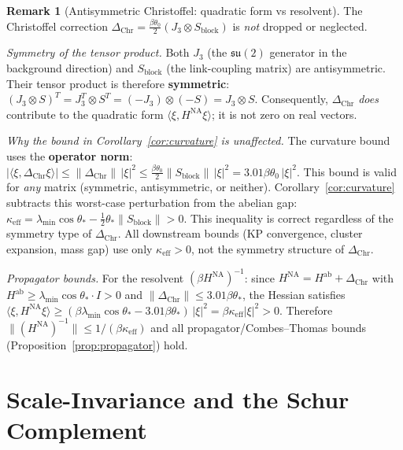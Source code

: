 \documentclass[11pt]{article}
\theoremstyle{definition}
\newtheorem{remark}[theorem]{Remark}
\newcommand{\su}{\mathfrak{su}}
\begin{document}
\begin{remark}[Antisymmetric Christoffel: quadratic form vs resolvent]%
\label{rem:antisym-resolvent}
The Christoffel correction $\Delta_{\mathrm{Chr}}
=\frac{\beta\theta_0}{2}(J_3\otimes S_{\mathrm{block}})$
is \emph{not} dropped or neglected.

\emph{Symmetry of the tensor product.}
Both $J_3$ (the $\su(2)$ generator in the background direction)
and $S_{\mathrm{block}}$ (the link-coupling matrix) are
antisymmetric.  Their tensor product is therefore
\textbf{symmetric}:
$(J_3\otimes S)^T=J_3^T\otimes S^T=(-J_3)\otimes(-S)
=J_3\otimes S$.
Consequently, $\Delta_{\mathrm{Chr}}$ \emph{does}
contribute to the quadratic form
$\langle\xi,H^{\mathrm{NA}}\xi\rangle$; it is not
zero on real vectors.

\emph{Why the bound in Corollary~\ref{cor:curvature} is
unaffected.}
The curvature bound uses the \textbf{operator norm}:
$|\langle\xi,\Delta_{\mathrm{Chr}}\xi\rangle|
\le\|\Delta_{\mathrm{Chr}}\|\,|\xi|^2
\le\frac{\beta\theta_0}{2}\|S_{\mathrm{block}}\|\,|\xi|^2
=3.01\beta\theta_0\,|\xi|^2$.
This bound is valid for \emph{any} matrix
(symmetric, antisymmetric, or neither).
Corollary~\ref{cor:curvature} subtracts this
worst-case perturbation from the abelian gap:
$\kappa_{\mathrm{eff}}
=\lambda_{\min}\cos\theta_*
-\tfrac{1}{2}\theta_*\|S_{\mathrm{block}}\|>0$.
This inequality is correct regardless of the symmetry
type of $\Delta_{\mathrm{Chr}}$.  All downstream bounds
(KP convergence, cluster expansion, mass gap) use only
$\kappa_{\mathrm{eff}}>0$, not the symmetry structure
of $\Delta_{\mathrm{Chr}}$.

\emph{Propagator bounds.}
For the resolvent $(\beta H^{\mathrm{NA}})^{-1}$:
since $H^{\mathrm{NA}}=H^{\mathrm{ab}}+\Delta_{\mathrm{Chr}}$
with $H^{\mathrm{ab}}\ge\lambda_{\min}\cos\theta_*\cdot I>0$
and $\|\Delta_{\mathrm{Chr}}\|\le 3.01\beta\theta_*$,
the Hessian satisfies
$\langle\xi,H^{\mathrm{NA}}\xi\rangle
\ge(\beta\lambda_{\min}\cos\theta_*-3.01\beta\theta_*)\,|\xi|^2
=\beta\kappa_{\mathrm{eff}}|\xi|^2>0$.
Therefore $\|(H^{\mathrm{NA}})^{-1}\|\le 1/(\beta\kappa_{\mathrm{eff}})$
and all propagator/Combes--Thomas bounds
(Proposition~\ref{prop:propagator}) hold.
\end{remark}

\section{Scale-Invariance and the Schur Complement}\label{sec:multiscale}
\end{document}
